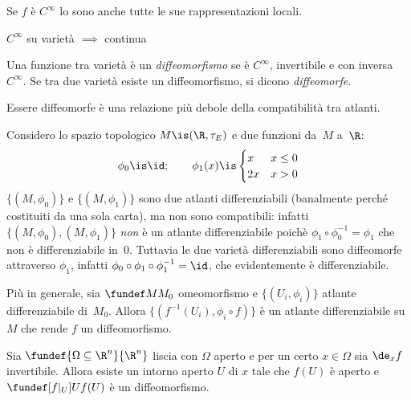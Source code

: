 \begin{ex}
	Se $f$ è $C^\infty$ lo sono anche tutte le sue rappresentazioni locali.
\end{ex}

\begin{ex}
	$C^\infty$ su varietà $\implies$ continua
\end{ex}

\begin{defn}
	Una funzione tra varietà è un \emph{diffeomorfismo}
	se è $C^\infty$, invertibile e con inversa $C^\infty$.
	Se tra due varietà esiste un diffeomorfismo, si dicono \emph{diffeomorfe}.
\end{defn}

\begin{oss}
	Essere diffeomorfe è una relazione più debole della compatibilità tra atlanti.
\end{oss}

\begin{es}
	Considero lo spazio topologico $M \is (\R,\tau_E)$ e due funzioni da~$M$ a~$\R$:
	\[\phi_0\is \id; \qquad
	\phi_1(x)\is
	\begin{cases}
		x & x\le 0 \\
		2x & x>0
	\end{cases}\]
	$\{(M,\phi_0)\}$ e $\{(M,\phi_1)\}$ sono due atlanti differenziabili
	(banalmente perché costituiti da una sola carta),
	ma non sono compatibili:
	infatti $\{(M,\phi_0),(M,\phi_1)\}$ \emph{non} è un atlante differenziabile
	poichè $\phi_1 \circ \phi_0^{-1} = \phi_1$ che non è differenziabile in~0.
	Tuttavia le due varietà differenziabili sono diffeomorfe attraverso $\phi_1$,
	infatti $\phi_0 \circ \phi_1 \circ \phi_1^{-1} = \id$,
	che evidentemente è differenziabile.
\end{es}

\begin{es}
	Più in generale,
	sia $\fundef M{M_0}$ omeomorfismo
	e $\{(U_i,\phi_i)\}$ atlante differenziabile di~$M_0$.
	Allora $\{(f^{-1}(U_i),\phi_i\circ f)\}$ è un atlante differenziabile su~$M$
	che rende $f$ un diffeomorfismo.
\end{es}


\begin{fat}
	Sia $\fundef{\Omega\subseteq\R^n}{\R^n}$ liscia con $\Omega$ aperto
	e per un certo $x\in\Omega$ sia $\de_xf$ invertibile.
	Allora esiste un intorno aperto $U$ di $x$
	tale che $f(U)$ è aperto e $\fundef[f|_U]U{f(U)}$ è un diffeomorfismo.
\end{fat}

